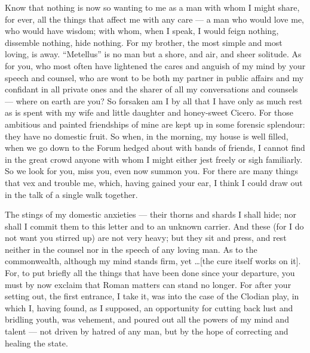 

 Know that nothing is now so wanting to me as a man with whom I might share, for ever, all the things that affect me with any care --- a man who would love me, who would have wisdom; with whom, when I speak, I would feign nothing, dissemble nothing, hide nothing. For my brother, the most simple and most loving, is away. ``Metellus'' is no man but a shore, and air, and sheer solitude. As for you, who most often have lightened the cares and anguish of my mind by your speech and counsel, who are wont to be both my partner in public affairs and my confidant in all private ones and the sharer of all my conversations and counsels --- where on earth are you? So forsaken am I by all that I have only as much rest as is spent with my wife and little daughter and honey-sweet Cicero. For those ambitious and painted friendships of mine are kept up in some forensic splendour: they have no domestic fruit. So when, in the morning, my house is well filled, when we go down to the Forum hedged about with bands of friends, I cannot find in the great crowd anyone with whom I might either jest freely or sigh familiarly. So we look for you, miss you, even now summon you. For there are many things that vex and trouble me, which, having gained your ear, I think I could draw out in the talk of a single walk together.

 The stings of my domestic anxieties --- their thorns and shards I shall hide; nor shall I commit them to this letter and to an unknown carrier. And these (for I do not want you stirred up) are not very heavy; but they sit and press, and rest neither in the counsel nor in the speech of any loving man. As to the commonwealth, although my mind stands firm, yet \ldots [the cure itself works on it]. For, to put briefly all the things that have been done since your departure, you must by now exclaim that Roman matters can stand no longer. For after your setting out, the first entrance, I take it, was into the case of the Clodian play, in which I, having found, as I supposed, an opportunity for cutting back lust and bridling youth, was vehement, and poured out all the powers of my mind and talent --- not driven by hatred of any man, but by the hope of correcting and healing the state.

